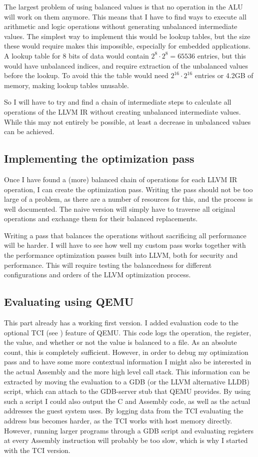 \documentclass{article}
\newcommand{\qemu}{QEMU}
\newcommand{\llvm}{LLVM}
\begin{document}
The largest problem of using balanced values is that no operation in the ALU will work on them anymore.
This means that I have to find ways to execute all arithmetic and logic operations without generating unbalanced intermediate values.
The simplest way to implement this would be lookup tables, but the size these would require makes this impossible, especially for embedded applications.
A lookup table for 8 bits of data would contain $2^8\cdot2^8=65536$ entries, but this would have unbalanced indices, and require extraction of the unbalanced values before the lookup.
To avoid this the table would need $2^{16}\cdot2^{16}$ entries or 4.2GB of memory, making lookup tables unusable.

So I will have to try and find a chain of intermediate steps to calculate all operations of the \llvm{} IR without creating unbalanced intermediate values.
While this may not entirely be possible, at least a decrease in unbalanced values can be achieved.

\subsection{Implementing the optimization pass}
Once I have found a (more) balanced chain of operations for each \llvm{} IR operation, I can create the optimization pass.
Writing the pass should not be too large of a problem, as there are a number of resources for this, and the process is well documented.
The naive version will simply have to traverse all original operations and exchange them for their balanced replacements.

Writing a pass that balances the operations without sacrificing all performance will be harder.
I will have to see how well my custom pass works together with the performance optimization passes built into \llvm{}, both for security and performance.
This will require testing the balancedness for different configurations and orders of the \llvm{} optimization process.

\subsection{Evaluating using \qemu{}}
This part already has a working first version.
I added evaluation code to the optional TCI (see ) feature of \qemu{}.
This code logs the operation, the register, the value, and whether or not the value is balanced to a file.
As an absolute count, this is completely sufficient.
However, in order to debug my optimization pass and to have some more contextual information I might also be interested in the actual Assembly and the more high level call stack.
This information can be extracted by moving the evaluation to a GDB (or the \llvm{} alternative LLDB) script, which can attach to the GDB-server stub that \qemu{} provides.
By using such a script I could also output the C and Assembly code, as well as the actual addresses the guest system uses.
By logging data from the TCI evaluating the address bus becomes harder, as the TCI works with host memory directly.
However, running larger programs through a GDB script and evaluating registers at every Assembly instruction will probably be too slow, which is why I started with the TCI version.
\end{document}
